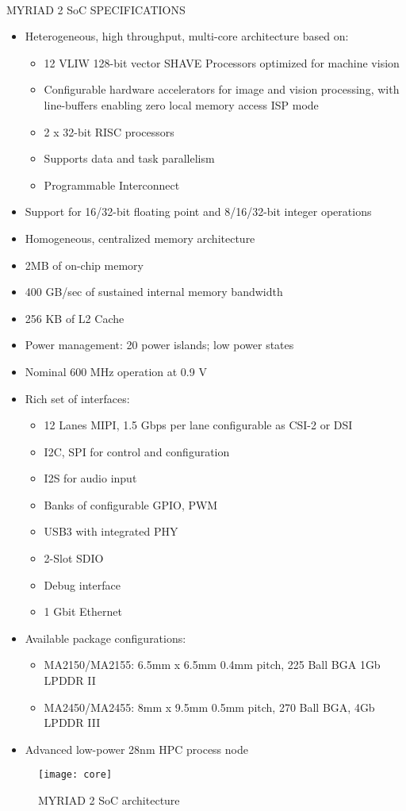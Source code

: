 \\MYRIAD 2 SoC SPECIFICATIONS\\
\begin{itemize}
	\item Heterogeneous, high throughput, multi-core architecture based on:
	\begin{itemize}
		\item 12 VLIW 128-bit vector SHAVE Processors optimized for machine vision
		\item Configurable hardware accelerators for image and vision processing, with line-buffers enabling zero local memory access ISP mode
		\item 2 x 32-bit RISC processors 
		\item Supports data and task parallelism 
		\item Programmable Interconnect
		\end{itemize}
		\item Support for 16/32-bit floating point and 8/16/32-bit integer operations
		\item Homogeneous, centralized memory architecture
		\item 2MB of on-chip memory
		\item 400 GB/sec of sustained internal memory bandwidth
		\item 256 KB of L2 Cache
		\item Power management: 20 power islands; low power states
		\item Nominal 600 MHz operation at 0.9 V
		\item Rich set of interfaces:
		\begin{itemize}
			\item 12 Lanes MIPI, 1.5 Gbps per lane configurable as CSI-2 or DSI
			\item I2C, SPI for control and configuration
			\item I2S for audio input
			\item Banks of configurable GPIO, PWM
			\item USB3 with integrated PHY
			\item 2-Slot SDIO
			\item Debug interface
			\item 1 Gbit Ethernet
		\end{itemize}
		\item Available package configurations:
		\begin{itemize}
			\item MA2150/MA2155: 6.5mm x 6.5mm 0.4mm pitch, 225 Ball BGA 1Gb LPDDR II
			\item MA2450/MA2455: 8mm x 9.5mm 0.5mm pitch, 270 Ball BGA, 4Gb LPDDR III
		\end{itemize}
		\item Advanced low-power 28nm HPC process node
\end{itemize}
%
\begin{figure}[htb]
\centering
\texttt{[image: core]}
\caption{MYRIAD 2 SoC architecture}
\label{fig:architecture}
\end{figure}
%
